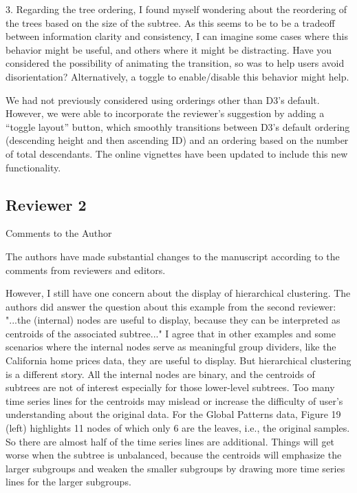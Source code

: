 \documentclass{article}
\begin{document}
\color{blue}
3. Regarding the tree ordering, I found myself wondering about the reordering of
the trees based on the size of the subtree. As this seems to be to be a tradeoff
between information clarity and consistency, I can imagine some cases where this
behavior might be useful, and others where it might be distracting. Have you
considered the possibility of animating the transition, so was to help users
avoid disorientation? Alternatively, a toggle to enable/disable this behavior
might help.

\color{black}
We had not previously considered using orderings other than D3's default.
However, we were able to incorporate the reviewer's suggestion by adding a
``toggle layout'' button, which smoothly transitions between D3's default ordering
(descending height and then ascending ID) and an ordering based on the number of
total descendants. The online vignettes have been updated to include this new
functionality.

\subsection{Reviewer 2}
\label{subsec:reviewer_2}

\color{blue}
Comments to the Author

The authors have made substantial changes to the manuscript according to the
comments from reviewers and editors.

However, I still have one concern about the display of hierarchical clustering.
The authors did answer the question about this example from the second reviewer:
"...the (internal) nodes are useful to display, because they can be interpreted
as centroids of the associated subtree..." I agree that in other examples and
some scenarios where the internal nodes serve as meaningful group dividers, like
the California home prices data, they are useful to display. But hierarchical
clustering is a different story. All the internal nodes are binary, and the
centroids of subtrees are not of interest especially for those lower-level
subtrees. Too many time series lines for the centroids may mislead or increase
the difficulty of user's understanding about the original data. For the Global
Patterns data, Figure 19 (left) highlights 11 nodes of which only 6 are the
leaves, i.e., the original samples. So there are almost half of the time series
lines are additional. Things will get worse when the subtree is unbalanced,
because the centroids will emphasize the larger subgroups and weaken the smaller
subgroups by drawing more time series lines for the larger subgroups.
\end{document}
